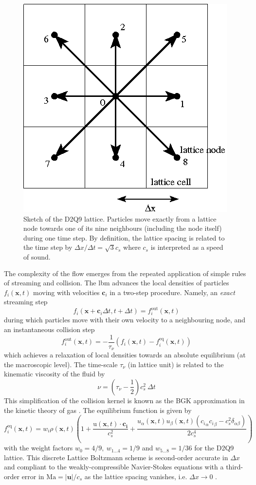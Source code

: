 \documentclass{jfm}
\newcommand{\EL}[1]{{\color{myred}{#1}}}
\begin{document}
\begin{figure}
  \centering
  \includegraphics[width=0.3\linewidth]{D2Q9/D2Q9}
  \caption{Sketch of the D2Q9 lattice. Particles move exactly from a lattice node towards one of its nine neighbours (including the node itself) during one time step. By definition, the lattice spacing is related to the time step by $\Delta x/ \Delta t = \sqrt{3} c_s$ where $c_s$ is interpreted as a speed of sound.}
  \label{fig:D2Q9}
\end{figure}


% 
The complexity of the flow emerges from the repeated application of simple rules of streaming and collision. The \ac{lbm} advances the local densities of particles $f_i(\mathbf{x},t)$ moving with velocities $\mathbf{c}_i$  in a two-step procedure. Namely, an \emph{exact} streaming step
\[
  f_i(\mathbf{x}+\mathbf{c}_i \Delta t, t + \Delta t) = f_i^{\mathrm{out}}(\mathbf{x},t)
\]
during which particles move with their own velocity to a neighbouring node, and an instantaneous collision step
\[
  f_i^{\mathrm{out}}(\mathbf{x},t) = -\frac 1 {\tau_\nu} \left(f_i(\mathbf{x},t) - f_i^\mathrm{eq}(\mathbf{x},t) \right)
\]
which achieves a relaxation of local densities towards an absolute equilibrium (at the macroscopic level). The time-scale $\tau_\nu$ (in lattice unit) is related to the kinematic viscosity of the fluid by
\[
  \nu = \left( {\tau_\nu} - \frac 1 2 \right) c_s^2 ~\Delta t
\]
This simplification of the collision kernel is known as the BGK approximation in the kinetic theory of gas \EL{\citep{BGK}}.
% 
The equilibrium function is given by
\[
  f_i^\mathrm{eq}(\mathbf{x},t) = w_i  \rho(\mathbf{x},t) \left( 1 + \frac{\mathrm u(\mathbf{x},t) \cdot \mathbf{c_i}}{c_s^2} +
    \frac{u_\alpha(\mathbf{x},t) u_\beta(\mathbf{x},t)({c_i}_\alpha {c_i}_\beta - c_s^2 \delta_{\alpha\beta})}{2 c_s^4} \right)
\]
with the weight factors $w_0=4/9,~w_{1...4} = 1/9$ and $w_{5...8}=1/36$ for the D2Q9 lattice.
This discrete Lattice Boltzmann scheme is second-order accurate in $\Delta x $ and compliant to the weakly-compressible Navier-Stokes equations with a third-order error in $\mathrm{Ma}=|\mathbf{u}|/c_s$ as the lattice spacing vanishes, i.e. $\Delta x \to 0$ \EL{\citep{succi_book}}.
\end{document}
